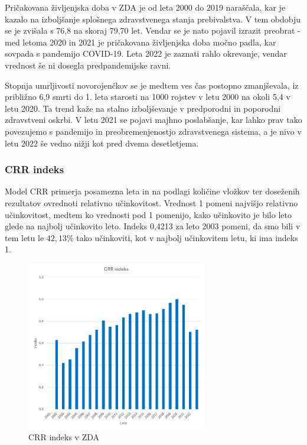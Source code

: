 \documentclass[12pt,a4paper]{article}
\theoremstyle{definition}
\begin{document}
Pričakovana življenjska doba v ZDA je od leta 2000 do 2019 naraščala, 
kar je kazalo na izboljšanje splošnega zdravstvenega stanja prebivalstva. 
V tem obdobju se je zvišala s 76,8 na skoraj 79,70 let. 
Vendar se je nato pojavil izrazit preobrat - med letoma 2020 in 2021 je pričakovana življenjska doba močno padla, 
kar sovpada s pandemijo COVID-19. Leta 2022 je zaznati rahlo okrevanje, vendar vrednost še ni dosegla predpandemijske ravni.

Stopnja umrljivosti novorojenčkov se je medtem ves čas postopno zmanjševala, iz približno 6,9 smrti do 1. leta starosti na 
1000 rojstev v letu 2000 na okoli 5,4 v letu 2020. 
Ta trend kaže na stalno izboljševanje v predporodni in poporodni zdravstveni oskrbi. 
V letu 2021 se pojavi majhno poslabšanje, 
kar lahko prav tako povezujemo s pandemijo in preobremenjenostjo zdravstvenega sistema, 
a je nivo v letu 2022 še vedno nižji kot pred dvema desetletjema.

\subsubsection{CRR indeks}
Model CRR primerja posamezna leta in na podlagi količine vložkov ter doseženih rezultatov ovrednoti relativno učinkovitost. 
Vrednost 1 pomeni najvišjo relativno učinkovitost, medtem ko vrednosti pod 1 pomenijo, 
kako učinkovito je bilo leto glede na najbolj učinkovito leto. Indeks 0,4213 za leto 2003 pomeni, 
da smo bili v tem letu le $42{,}13\%$ tako učinkoviti, kot v najbolj učinkovitem letu, ki ima indeks 1.

\begin{figure}[H]
    \centering
    \includegraphics[width=0.7\textwidth]{zda_CRR_indeks.png}
    \caption{CRR indeks v ZDA}
    \label{fig:zda_CRR_indeks}
\end{figure}
\end{document}
